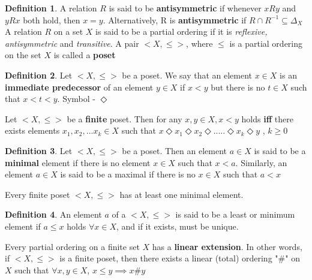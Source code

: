 \documentclass{article}
\theoremstyle{definition}
\newtheorem*{defi}{Definition}
\theoremstyle{definition}
\newenvironment{manualprop}[1]{%
  \renewcommand\themanualpropinner{#1}%
  \manualpropinner
}{\endmanualpropinner}
\theoremstyle{named}
\begin{document}
\begin{defi}
A relation $R$ is said to be \textbf{{antisymmetric}} if whenever $xRy$ and $yRx$ both hold, then $x = y$.
Alternatively, R is \textbf{{antisymmetric}} if $R \cap R^{-1} \subseteq \Delta_{X}$ \newline
A relation $R$ on a set $X$ is said to be a partial ordering if it is \emph{reflexive, antisymmetric} and \emph{transitive}.  
\newline
A pair $<X, \leq>$, where $\leq$ is a partial ordering on the set $X$ is called a \textbf{poset}
\end{defi}

\begin{defi}
Let $<X, \leq >$ be a poset. We say that an element $x \in X$ is an \textbf{immediate predecessor} of an element $y \in X$ if $x < y$ but there is no $t \in X$ such that $x < t < y$. Symbol - $\Diamond$ 
\end{defi}

\begin{manualprop}{4}
Let $<X, \leq >$ be a \textbf{finite} poset. Then for any $x, y \in X, x < y$ holds \textbf{iff} there exists elements $x_1, x_2, ... x_k \in X$ such that $x \Diamond x_1  \Diamond x_2  \Diamond  .....  \Diamond x_k  \Diamond y$ , $k\geq 0$
\end{manualprop}

\begin{defi}
Let $<X, \leq >$ be a poset. Then an element $a \in X$ is said to be a \textbf{minimal} element if there is no element $x \in X$ such that $x < a$. Similarly, an element $a \in X$ is said to be a maximal if there is no $x \in X$ such that  $a < x$
\end{defi}

\begin{manualprop}{5}
Every finite poset $<X, \leq>$ has at least one minimal element.
\end{manualprop}

\begin{defi}
An element $a$ of a $<X, \leq>$ is said to be a least or minimum element if $a \leq x$ holds  $\forall x \in X$, and if it exists, must be unique.
\end{defi}

\begin{manualprop}{6}
Every partial ordering on a finite set $X$ has a \textbf{linear extension}. In other words, if $<X, \leq>$ is a finite poset, then there exists a linear (total) ordering "$\#$" on $X$ such that $\forall x, y \in X$, $x \leq y \implies x \# y$
\end{manualprop}
\end{document}
